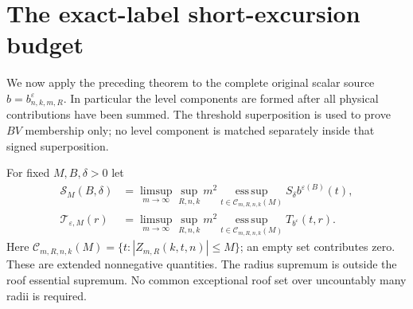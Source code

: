 \section{The exact-label short-excursion budget}
\label{sec:v74-endpoint-budget}
We now apply the preceding theorem to the complete original scalar
source $b=b^\varepsilon_{n,k,m,R}$. In particular the level components
are formed after all physical contributions have been summed.
The threshold superposition is used to prove $BV$ membership only;
no level component is matched separately inside that signed
superposition.

For fixed $M,B,\delta>0$ let
\begin{align}
 \mathcal S_M(B,\delta)
  &=\limsup_{m\to\infty}\sup_{R,n,k}m^2
       \operatorname*{ess\,sup}_{t\in\mathcal C_{m,R,n,k}(M)}
             S_\delta b^{\varepsilon(B)}(t),\label{eq:v74-S-budget}\\
 \mathcal T_{\varepsilon,M}(r)
  &=\limsup_{m\to\infty}\sup_{R,n,k}m^2
       \operatorname*{ess\,sup}_{t\in\mathcal C_{m,R,n,k}(M)}
             T_{b^\varepsilon}(t,r).\label{eq:v74-T-budget}
\end{align}
Here $\mathcal C_{m,R,n,k}(M)=\{t:|Z_{m,R}(k,t,n)|\le M\}$;
an empty set contributes zero. These are extended nonnegative
quantities. The radius supremum is outside the roof essential
supremum. No common exceptional roof set over uncountably many
radii is required.

